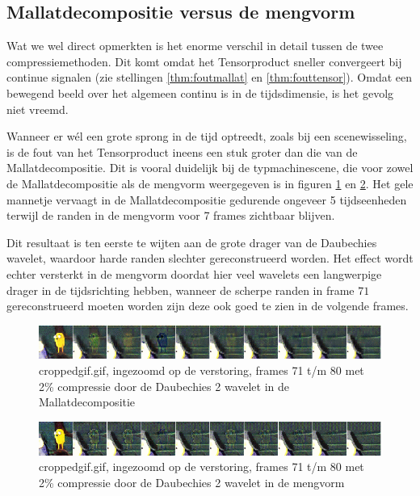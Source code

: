\subsection{Mallatdecompositie versus de mengvorm}
Wat we wel direct opmerkten is het enorme verschil in detail tussen de twee compressiemethoden. 
Dit komt omdat het Tensorproduct sneller convergeert bij continue signalen 
(zie stellingen \ref{thm:foutmallat} en \ref{thm:fouttensor}). 
Omdat een bewegend beeld over het algemeen continu is in de tijdsdimensie, is het gevolg niet vreemd.

Wanneer er w\'el een grote sprong in de tijd optreedt, zoals bij een scenewisseling, is de fout van 
het Tensorproduct ineens een stuk groter dan die van de Mallatdecompositie. 
Dit is vooral duidelijk bij de typmachinescene, die voor zowel de Mallatdecompositie als de mengvorm
weergegeven is in figuren \ref{fig:frames_tensor} en \ref{fig:frames_nontensor}.
Het gele mannetje vervaagt in de Mallatdecompositie gedurende ongeveer 5 tijdseenheden 
terwijl de randen in de mengvorm voor 7 frames zichtbaar blijven.

Dit resultaat is ten eerste te wijten aan de grote drager van de Daubechies wavelet, 
waardoor harde randen slechter gereconstrueerd worden.
Het effect wordt echter versterkt in de mengvorm doordat hier veel wavelets een langwerpige
drager in de tijdsrichting hebben, wanneer de scherpe randen in frame $71$ gereconstrueerd moeten worden
zijn deze ook goed te zien in de volgende frames.

\begin{figure}[h]
\centering
\includegraphics[width=\linewidth]{plaatjes/frames_notensor_small.png}
\caption{croppedgif.gif, ingezoomd op de verstoring, frames 71 t/m 80 met 2\% compressie door de Daubechies 2 wavelet in de Mallatdecompositie}
\label{fig:frames_tensor}
\end{figure}

\begin{figure}[h]
\centering
\includegraphics[width=\linewidth]{plaatjes/frames_tensor_small.png}
\caption{croppedgif.gif, ingezoomd op de verstoring, frames 71 t/m 80 met 2\% compressie door de Daubechies 2 wavelet in de mengvorm}
\label{fig:frames_nontensor}
\end{figure}
